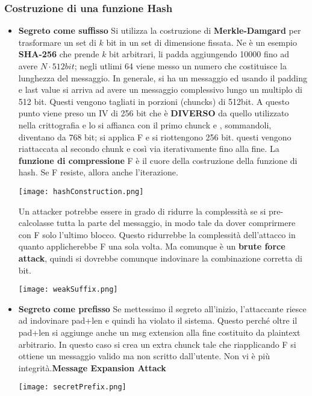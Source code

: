 \documentclass{article}
\theoremstyle{remark}
\begin{document}
\subsubsection{Costruzione di una funzione Hash}
\begin{itemize}
	\item \textbf{Segreto come suffisso} Si utilizza la costruzione di \textbf{Merkle-Damgard} per trasformare un set di $k$ bit in un set di dimensione fissata. Ne è un esempio \textbf{SHA-256} che prende $k$ bit arbitrari, li padda aggiungendo 10000 fino ad avere $N\cdot512bit$; negli utlimi 64 viene messo un numero che costituisce la lunghezza del messaggio.\newline
	      In generale, si ha un messaggio ed usando il padding e last value si arriva ad avere un messaggio complessivo lungo un multiplo di 512 bit. Questi vengono tagliati in porzioni (chuncks) di 512bit. A questo punto viene preso un IV di 256 bit che è \textbf{DIVERSO} da quello utilizzato nella crittografia e lo si affianca con il primo chunck e , sommandoli, diventano da 768 bit; si applica F e si riottengono 256 bit. questi vengono riattaccata al secondo chunk e così via iterativamente fino alla fine. La \textbf{funzione di compressione} F è il cuore della costruzione della funzione di hash. Se F resiste, allora anche l'iterazione.
	      \begin{center}
		      \texttt{[image: hashConstruction.png]}
	      \end{center}
	      Un attacker potrebbe essere in grado di ridurre la complessità se si pre-calcolasse tutta la parte del messaggio, in modo tale da dover comprirmere con F solo l'ultimo blocco. Questo ridurrebbe la complessità dell'attacco in quanto applicherebbe F una sola volta. Ma comunque è un \textbf{brute force attack}, quindi si dovrebbe comunque indovinare la combinazione corretta di bit.
	      \begin{center}
		      \texttt{[image: weakSuffix.png]}
	      \end{center}
	\item \textbf{Segreto come prefisso} Se mettessimo il segreto all'inizio, l'attaccante riesce ad indovinare pad+len e quindi ha violato il sistema. Questo perché oltre il pad+len si aggiunge anche un msg extension alla fine costituito da plaintext arbitrario. In questo caso si crea un extra chunck tale che riapplicando F si ottiene un messaggio valido ma non scritto dall'utente. Non vi è più integrità.\textbf{Message Expansion Attack}
	      \begin{center}
		      \texttt{[image: secretPrefix.png]}
	      \end{center}
\end{itemize}
\end{document}
